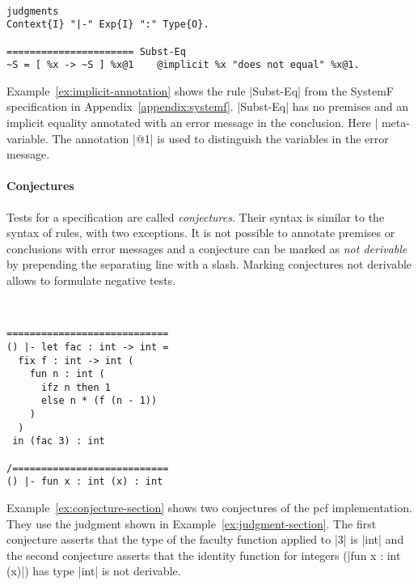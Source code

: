 
\begin{example}{~}
\begin{lstlisting}[language=sltc]
judgments
Context{I} "|-" Exp{I} ":" Type{O}.

====================== Subst-Eq
~S = [ %x -> ~S ] %x@1    @implicit %x "does not equal" %x@1.
\end{lstlisting}
\label{ex:implicit-annotation}
\end{example}

Example~\ref{ex:implicit-annotation} shows the rule \code|Subst-Eq|
from the SystemF specification in
Appendix~\ref{appendix:systemf}. \code|Subst-Eq| has no premises and
an implicit equality annotated with an error message in the
conclusion. Here \code|%
meta-variable. The annotation \code|@1| is used to distinguish the
variables in the error message.

\paragraph{Conjectures} Tests for a specification are called
\textit{conjectures}. Their syntax is similar to the syntax of rules,
with two exceptions. It is not possible to annotate premises or
conclusions with error messages and a conjecture can be marked as
\textit{not derivable} by prepending the separating line with a
slash. Marking conjectures not derivable allows to formulate negative
tests.

\begin{example}{~}
\begin{lstlisting}[language=sltc]
============================
() |- let fac : int -> int = 
  fix f : int -> int (
    fun n : int (
      ifz n then 1 
      else n * (f (n - 1))
    )
  )
 in (fac 3) : int

/===========================
() |- fun x : int (x) : int
\end{lstlisting}
\label{ex:conjecture-section}
\end{example}

Example~\ref{ex:conjecture-section} shows two conjectures of the
\gls{pcf} implementation. They use the judgment shown in
Example~\ref{ex:judgment-section}. The first conjecture asserts that
the type of the faculty function applied to \code|3| is \code|int| and
the second conjecture asserts that the identity function for integers
(\code|fun x : int (x)|) has type \code|int| is not derivable.

